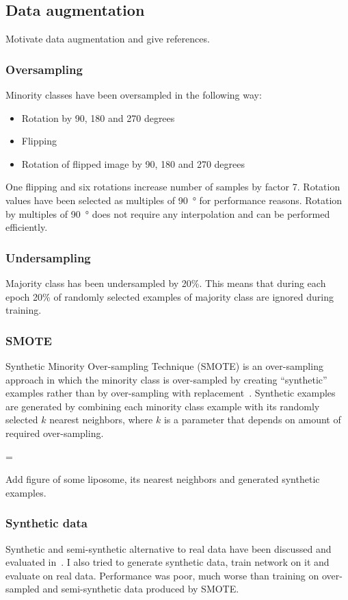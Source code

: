 \documentclass[a4paper, 11pt, table]{article}
\newenvironment{warning}
  {\par\begin{mdframed}[linewidth=2pt,linecolor=red]%
    \begin{list}{}{\leftmargin=1cm
                   \labelwidth=\leftmargin}\item[\Large\ding{43}]}
  {\end{list}\end{mdframed}\par}
\begin{document}
\subsection{Data augmentation}
Motivate data augmentation and give references.

\subsubsection{Oversampling}
Minority classes have been oversampled in the following way:

\begin{itemize}
\item Rotation by 90, 180 and 270 degrees
\item Flipping
\item Rotation of flipped image by 90, 180 and 270 degrees
\end{itemize}

One flipping and six rotations increase number of samples by factor 7. Rotation values have been selected as multiples of \SI{90}{\degree} for performance reasons. Rotation by multiples of \SI{90}{\degree} does not require any interpolation and can be performed efficiently.

\subsubsection{Undersampling}
Majority class has been undersampled by 20\%. This means that during each epoch 20\% of randomly selected examples of majority class are ignored during training.

\subsubsection{SMOTE}
Synthetic Minority Over-sampling Technique (SMOTE) is an over-sampling approach in which the minority class is over-sampled by creating “synthetic” examples rather than by over-sampling with replacement~\cite{smote_chawla}. 
Synthetic examples are generated by combining each minority class example with its randomly selected $k$ nearest neighbors, where $k$ is a parameter that depends on amount of required over-sampling.

\begin{warning}
Add figure of some liposome, its nearest neighbors and generated synthetic examples.
\end{warning}

\subsubsection{Synthetic data}
Synthetic and semi-synthetic alternative to real data have been discussed and evaluated in~\cite{ishaq_synthetic}. I also tried to generate synthetic data, train network on it and evaluate on real data. Performance was poor, much worse than training on over-sampled and semi-synthetic data produced by SMOTE. 
\end{document}
